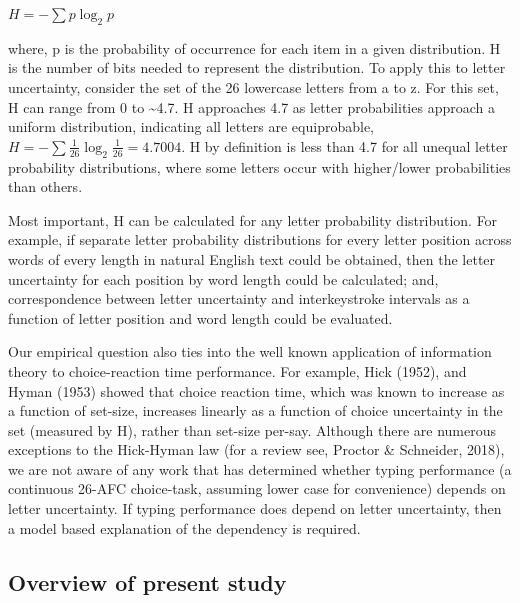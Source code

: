 \documentclass[,man,donotrepeattitle,floatsintext]{apa6}
\begin{document}
\(H = -\sum p \log_2 p\)

where, p is the probability of occurrence for each item in a given distribution. H is the number of bits needed to represent the distribution. To apply this to letter uncertainty, consider the set of the 26 lowercase letters from a to z. For this set, H can range from 0 to \textasciitilde{}4.7. H approaches 4.7 as letter probabilities approach a uniform distribution, indicating all letters are equiprobable, \(H = -\sum \frac{1}{26} \log_2 \frac{1}{26} = 4.7004\). H by definition is less than 4.7 for all unequal letter probability distributions, where some letters occur with higher/lower probabilities than others.

Most important, H can be calculated for any letter probability distribution. For example, if separate letter probability distributions for every letter position across words of every length in natural English text could be obtained, then the letter uncertainty for each position by word length could be calculated; and, correspondence between letter uncertainty and interkeystroke intervals as a function of letter position and word length could be evaluated.

Our empirical question also ties into the well known application of information theory to choice-reaction time performance. For example, Hick (1952), and Hyman (1953) showed that choice reaction time, which was known to increase as a function of set-size, increases linearly as a function of choice uncertainty in the set (measured by H), rather than set-size per-say. Although there are numerous exceptions to the Hick-Hyman law (for a review see, Proctor \& Schneider, 2018), we are not aware of any work that has determined whether typing performance (a continuous 26-AFC choice-task, assuming lower case for convenience) depends on letter uncertainty. If typing performance does depend on letter uncertainty, then a model based explanation of the dependency is required.

\hypertarget{overview-of-present-study}{%
\subsection{Overview of present study}\label{overview-of-present-study}}
\end{document}

